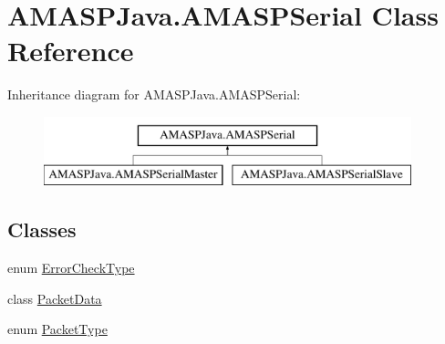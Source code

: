 \hypertarget{class_a_m_a_s_p_java_1_1_a_m_a_s_p_serial}{}\section{A\+M\+A\+S\+P\+Java.\+A\+M\+A\+S\+P\+Serial Class Reference}
\label{class_a_m_a_s_p_java_1_1_a_m_a_s_p_serial}
Inheritance diagram for A\+M\+A\+S\+P\+Java.\+A\+M\+A\+S\+P\+Serial\+:\begin{figure}[H]
\begin{center}
\leavevmode
\includegraphics[height=2.000000cm]{class_a_m_a_s_p_java_1_1_a_m_a_s_p_serial}
\end{center}
\end{figure}
\subsection*{Classes}
\begin{DoxyCompactItemize}
\item 
enum \hyperlink{enum_a_m_a_s_p_java_1_1_a_m_a_s_p_serial_1_1_error_check_type}{Error\+Check\+Type}
\item 
class \hyperlink{class_a_m_a_s_p_java_1_1_a_m_a_s_p_serial_1_1_packet_data}{Packet\+Data}
\item 
enum \hyperlink{enum_a_m_a_s_p_java_1_1_a_m_a_s_p_serial_1_1_packet_type}{Packet\+Type}
\end{DoxyCompactItemize}
